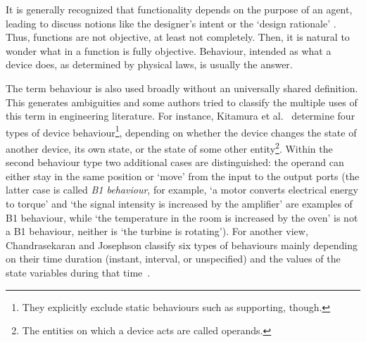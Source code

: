 \documentclass[sw]{iosart2x}
\newcommand{\firstTimeKeyWord}[1]{\textit{#1}}
\newcommand{\quotes}[1]{`#1'}
\begin{document}
It is generally recognized that functionality depends on the purpose of an agent, leading to discuss notions like the designer's intent or the \quotes{design rationale} \cite{chandrasekaranFunctionalRepresentationDesign1993,kitamuraOntologyBasedFunctionalKnowledgeModeling2004}. 
Thus, functions are not objective, at least not completely. 
Then, it is natural to wonder what in a function is fully objective. Behaviour, intended as what a device does, as determined by physical laws, is usually the answer.    


The term behaviour is also used broadly without an universally shared definition. 
This generates ambiguities and some authors tried to classify the multiple uses of this term in engineering literature. For instance, 
Kitamura et al.~\cite{kitamuraOntologyBasedFunctionalKnowledgeModeling2004} determine four types of device behaviour\footnote{They explicitly exclude static behaviours such as supporting, though.}, depending on whether the device changes the state of another device, its own state, or the state of some other entity\footnote{The entities on which a device acts are called operands.}. Within the second behaviour type two additional cases are distinguished: the operand can either stay in the same position or `move' from the input to the output ports (the latter case is called \firstTimeKeyWord{B1 behaviour}, for example, \quotes{a motor converts electrical energy to torque} and \quotes{the signal intensity is increased by the amplifier} are examples of B1 behaviour, while \quotes{the temperature in the room is increased by the oven} is not a B1 behaviour, neither is \quotes{the turbine is rotating}).
 For another view, Chandrasekaran and Josephson classify six types of behaviours mainly depending on their time duration (instant, interval, or unspecified) and the values of the state variables during that time~\cite{chandrasekaranFunctionDeviceRepresentation2000}.
\end{document}
